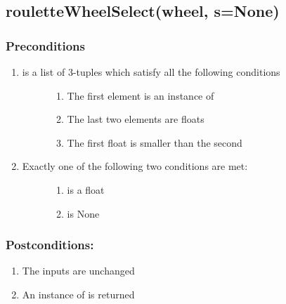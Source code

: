 \documentclass[letterpaper,10pt,english]{sphinxmanual}
\begin{document}
\subsection{rouletteWheelSelect(wheel, s=None)}
\label{contracts:roulettewheelselect-wheel-s-none}

\subsubsection{Preconditions}
\label{contracts:id31}\begin{enumerate}
\item {} \begin{description}
\item[{ is a list of 3-tuples which satisfy all the following conditions}] \leavevmode\begin{enumerate}
\item {} 
The first element is an instance of 

\item {} 
The last two elements are floats

\item {} 
The first float is smaller than the second

\end{enumerate}

\end{description}

\item {} \begin{description}
\item[{Exactly one of the following two conditions are met:}] \leavevmode\begin{enumerate}
\item {} 
 is a float

\item {} 
 is None

\end{enumerate}

\end{description}

\end{enumerate}


\subsubsection{Postconditions:}
\label{contracts:id32}\begin{enumerate}
\item {} 
The inputs are unchanged

\item {} 
An instance of  is returned

\end{enumerate}
\end{document}
